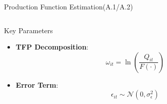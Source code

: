 \documentclass[aspectratio=169]{beamer}  %
\begin{document}
\begin{frame}{Production Function Estimation(A.1/A.2)}
\begin{columns}[T]
\begin{column}{0.48\textwidth}
\begin{alertblock}{Key Parameters}
\begin{itemize}
                \item \textbf{TFP Decomposition}:
                \begin{equation*}
                    \omega_{it} = \ln\left(\frac{Q_{it}}{F(\cdot)}\right)
                \end{equation*}
                
                \item \textbf{Error Term}:
                \begin{equation*}
                    \epsilon_{it} \sim \mathcal{N}(0,\sigma_\epsilon^2)
                \end{equation*}
            \end{itemize}
        \end{alertblock}
    \end{column}
\end{columns}

\vspace{0.3cm}
\begin{center}
\footnotesize
{}
\end{center}
\end{frame}
\end{document}
